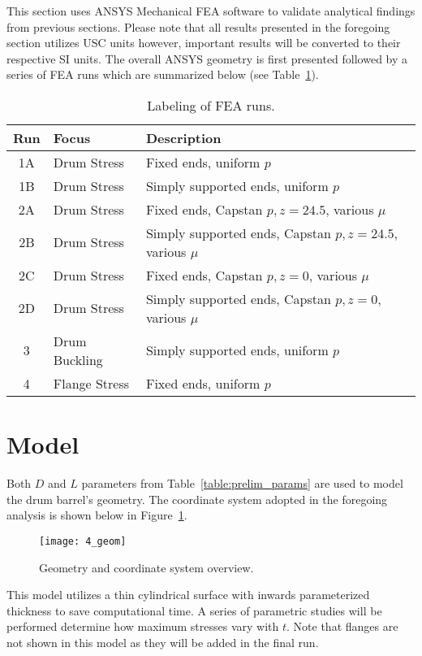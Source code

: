 This section uses ANSYS Mechanical FEA software \cite{ANSYS} to validate analytical findings from previous sections. Please note that all results presented in the foregoing section utilizes USC units however, important results will be converted to their respective SI units. The overall ANSYS geometry is first presented followed by a series of FEA runs which are summarized below (see Table~\ref{table:4_runs}).

\begin{table}[H]
  \centering
  \caption{Labeling of FEA runs.}
    \begin{tabular}{cll}
    \textbf{Run} & \textbf{Focus} & \textbf{Description}\\
    \hline
    1A    & Drum Stress & Fixed ends, uniform $p$\\
    1B    & Drum Stress & Simply supported ends, uniform $p$ \\
    2A    & Drum Stress & Fixed ends, Capstan $p, z=24.5$, various $\mu$ \\
    2B    & Drum Stress & Simply supported ends, Capstan $p, z=24.5$, various $\mu$ \\
    2C    & Drum Stress & Fixed ends, Capstan $p, z=0$, various $\mu$ \\
    2D    & Drum Stress & Simply supported ends, Capstan $p, z=0$, various $\mu$ \\
    3     & Drum Buckling & Simply supported ends, uniform $p$ \\
    4     & Flange Stress & Fixed ends, uniform $p$ \\
    \end{tabular}%
  \label{table:4_runs}%
\end{table}%


\section{Model}

Both $D$ and $L$ parameters from Table~\ref{table:prelim_params} are used to model the drum barrel's geometry. The coordinate system adopted in the foregoing analysis is shown below in Figure~\ref{fig:4_geom}. 

\begin{figure}[H]
	\centering
	\texttt{[image: 4\_geom]}
	\caption{Geometry and coordinate system overview.}
	\label{fig:4_geom}
\end{figure}

This model utilizes a thin cylindrical surface with inwards parameterized thickness to save computational time. A series of parametric studies will be performed determine how maximum stresses vary with $t$. Note that flanges are not shown in this model as they will be added in the final run.\\

